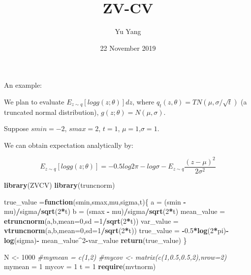 \documentclass[]{article}
\title{ZV-CV}
\author{Yu Yang}
\date{22 November 2019}
\newenvironment{Shaded}{\begin{snugshade}}{\end{snugshade}}
\newcommand{\KeywordTok}[1]{\textcolor[rgb]{0.13,0.29,0.53}{\textbf{#1}}}
\newcommand{\DataTypeTok}[1]{\textcolor[rgb]{0.13,0.29,0.53}{#1}}
\newcommand{\DecValTok}[1]{\textcolor[rgb]{0.00,0.00,0.81}{#1}}
\newcommand{\FloatTok}[1]{\textcolor[rgb]{0.00,0.00,0.81}{#1}}
\newcommand{\StringTok}[1]{\textcolor[rgb]{0.31,0.60,0.02}{#1}}
\newcommand{\CommentTok}[1]{\textcolor[rgb]{0.56,0.35,0.01}{\textit{#1}}}
\newcommand{\ControlFlowTok}[1]{\textcolor[rgb]{0.13,0.29,0.53}{\textbf{#1}}}
\newcommand{\OperatorTok}[1]{\textcolor[rgb]{0.81,0.36,0.00}{\textbf{#1}}}
\newcommand{\NormalTok}[1]{#1}
\begin{document}
\maketitle

An example:

We plan to evaluate \(E_{z\sim q}[log g(z;\theta)]dz\), where
\(q_t(z,\theta) = TN(\mu,\sigma/\sqrt{t})\) (a truncated normal
distribution), \(g(z;\theta)=N(\mu,\sigma)\).

Suppose \(smin = -2\), \(smax = 2\), \(t = 1\), \(\mu=1\),\(\sigma=1\).

We can obtain expectation analytically by:

\[ E_{z\sim q} [ log g(z;\theta)] = -0.5 log 2\pi - log\sigma - E_{z\sim q} \dfrac{(z-\mu)^2}{2\sigma^2} \]

\begin{Shaded}
\begin{Highlighting}[]
\KeywordTok{library}\NormalTok{(ZVCV)}
\KeywordTok{library}\NormalTok{(truncnorm)}

\NormalTok{true_value =}\ControlFlowTok{function}\NormalTok{(smin,smax,mu,sigma,t)\{}
\NormalTok{  a =}\StringTok{ }\NormalTok{(smin }\OperatorTok{-}\StringTok{ }\NormalTok{mu)}\OperatorTok{/}\NormalTok{sigma}\OperatorTok{/}\KeywordTok{sqrt}\NormalTok{(}\DecValTok{2}\OperatorTok{*}\NormalTok{t)}
\NormalTok{  b =}\StringTok{ }\NormalTok{(smax }\OperatorTok{-}\StringTok{ }\NormalTok{mu)}\OperatorTok{/}\NormalTok{sigma}\OperatorTok{/}\KeywordTok{sqrt}\NormalTok{(}\DecValTok{2}\OperatorTok{*}\NormalTok{t)}
\NormalTok{  mean_value =}\StringTok{ }\KeywordTok{etruncnorm}\NormalTok{(a,b,}\DataTypeTok{mean=}\DecValTok{0}\NormalTok{,}\DataTypeTok{sd =}\DecValTok{1}\OperatorTok{/}\KeywordTok{sqrt}\NormalTok{(}\DecValTok{2}\OperatorTok{*}\NormalTok{t))}
\NormalTok{  var_value =}\StringTok{ }\KeywordTok{vtruncnorm}\NormalTok{(a,b,}\DataTypeTok{mean=}\DecValTok{0}\NormalTok{,}\DataTypeTok{sd=}\DecValTok{1}\OperatorTok{/}\KeywordTok{sqrt}\NormalTok{(}\DecValTok{2}\OperatorTok{*}\NormalTok{t))}
\NormalTok{  true_value =}\StringTok{ }\OperatorTok{-}\FloatTok{0.5}\OperatorTok{*}\KeywordTok{log}\NormalTok{(}\DecValTok{2}\OperatorTok{*}\NormalTok{pi)}\OperatorTok{-}\KeywordTok{log}\NormalTok{(sigma)}\OperatorTok{-}\StringTok{ }\NormalTok{mean_value}\OperatorTok{^}\DecValTok{2}\OperatorTok{-}\NormalTok{var_value}
  \KeywordTok{return}\NormalTok{(true_value)}
\NormalTok{\}}


\NormalTok{N <-}\StringTok{ }\DecValTok{1000}
\CommentTok{#mymean = c(1,2)}
\CommentTok{#mycov <- matrix(c(1,0.5,0.5,2),nrow=2)}
\NormalTok{mymean =}\StringTok{ }\DecValTok{1}
\NormalTok{mycov =}\StringTok{ }\DecValTok{1}
\NormalTok{t =}\StringTok{ }\DecValTok{1}
\KeywordTok{require}\NormalTok{(mvtnorm)}
\end{Highlighting}
\end{Shaded}
\end{document}
